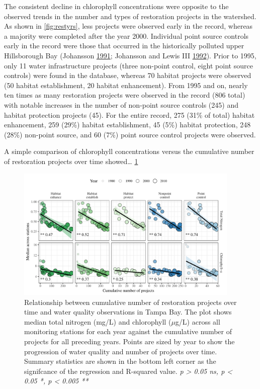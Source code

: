 \documentclass[]{article}
\begin{document}
The consistent decline in chlorophyll concentrations were opposite to
the observed trends in the number and types of restoration projects in
the watershed. As shown in \cref{fig:restyrs}, less projects were
observed early in the record, whereas a majority were completed after
the year 2000. Individual point source controls early in the record were
those that occurred in the historically polluted upper Hillsborough Bay
(Johansson \protect\hyperlink{ref-Johansson91}{1991}; Johansson and
Lewis III \protect\hyperlink{ref-Johansson92}{1992}). Prior to 1995,
only 11 water infrastructure projects (three non-point control, eight
point source controls) were found in the database, whereas 70 habitat
projects were observed (50 habitat establishment, 20 habitat
enhancement). From 1995 and on, nearly ten times as many restoration
projects were observed in the record (806 total) with notable increases
in the number of non-point source controls (245) and habitat protection
projects (45). For the entire record, 275 (31\% of total) habitat
enhancement, 259 (29\%) habitat establishment, 45 (5\%) habitat
protection, 248 (28\%) non-point source, and 60 (7\%) point source
control projects were observed.

A simple comparison of chlorophyll concentrations versus the cumulative
number of restoration projects over time showed\ldots{}
\cref{fig:cumprj}

\begin{figure}
\centerline{\includegraphics[width = 0.95\textwidth]{figs/cumprj.pdf}}
\caption{Relationship between cumulative number of restoration projects over time and water quality observations in Tampa Bay. The plot shows median total nitrogen (mg/L) and chlorophyll ($\mu$g/L) across all monitoring stations for each year against the cumulative number of projects for all preceding years.  Points are sized by year to show the progression of water quality and number of projects over time.  Summary statistics are shown in the bottom left corner as the signifcance of the regression and R-squared value. \textit{p > 0.05 ns, p < 0.05 *, p < 0.005 **}}
\label{fig:cumprj}
\end{figure}
\end{document}
